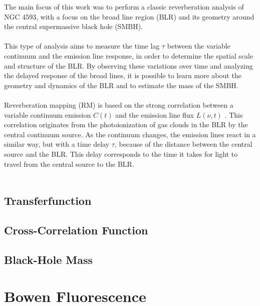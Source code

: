 The main focus of this work was to perform a classic reverberation analysis of NGC 4593, with a focus on the broad line region (BLR) and its geometry around the central supermassive black hole (SMBH).\\\\
This type of analysis aims to measure the time lag $\tau$ between the variable continuum and the emission line response, in order to determine the spatial scale and structure of the BLR. By observing these variations over time and analyzing the delayed response of the broad lines, it is possible to learn more about the geometry and dynamics of the BLR and to estimate the mass of the SMBH.\\\\
Reverberation mapping (RM) is based on the strong correlation between a variable continuum emission $C(t)$ and the emission line flux $L(\nu, t)$ \parencite{horne2021space}. This correlation originates from the photoionization of gas clouds in the BLR by the central continuum source. As the continuum changes, the emission lines react in a similar way, but with a time delay $\tau$, because of the distance between the central source and the BLR. This delay corresponds to the time it takes for light to travel from the central source to the BLR.\\\\

\subsection{Transferfunction}
\label{subsec:rm_transferfunction}

\subsection{Cross-Correlation Function}
\label{subsec:rm_ccf}

\subsection{Black-Hole Mass}
\label{subsec:rm_bh_mass}

\section{Bowen Fluorescence}
\label{sec:bowen_fluorescence}